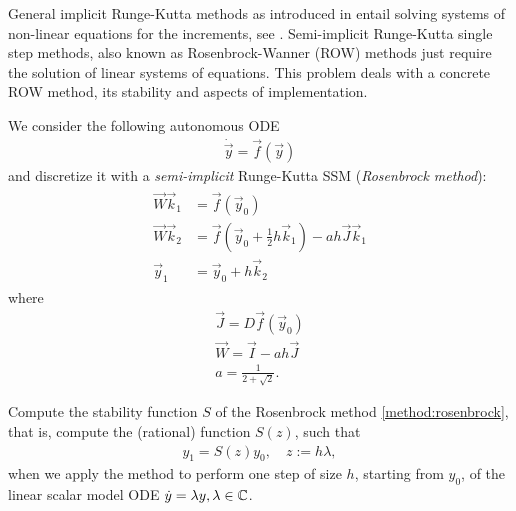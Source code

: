 \begin{problem}\label{prb:sirk-ssm}
  General implicit Runge-Kutta methods as introduced in  entail
  solving systems of non-linear equations for the increments, see
  . Semi-implicit Runge-Kutta single step methods, also
  known as Rosenbrock-Wanner (ROW) methods  just require the solution
  of linear systems of equations. This problem deals with a concrete ROW method,
  its stability and aspects of implementation.

  We consider the following  autonomous ODE
\begin{align}
 \dot{\vec{y}} = \vec{f}(\vec{y})
\end{align}
and discretize it with a \emph{semi-implicit} Runge-Kutta SSM (\emph{Rosenbrock method}):
\begin{gather} \label{method:rosenbrock}
  \begin{aligned}
    \vec{W} \vec{k}_1 & = \vec{f}(\vec{y}_0) \\
    \vec{W} \vec{k}_2 & = \vec{f}(\vec{y}_0 + \frac{1}{2} h \vec{k}_1) - a h \vec{J} \vec{k}_1 \\
    \vec{y}_1 & = \vec{y}_0 + h \vec{k}_2
  \end{aligned}
\end{gather}
where
\begin{align*}
 \vec{J} = D\vec{f}(\vec{y}_0) \\
 \vec{W} = \vec{I} - ah \vec{J} \\
 a = \frac{1}{2+\sqrt{2}}.
\end{align*}


\begin{subproblem}[2]
 Compute the stability function $S$ of the Rosenbrock method \eqref{method:rosenbrock}, that is, compute the (rational) function $S(z)$, such that
 \begin{align*}
  y_1 = S(z) y_0, \quad z := h \lambda,
 \end{align*}
 when we apply the method to perform one step of size $h$, starting from $y_0$, of the linear scalar model ODE $\dot{y} = \lambda y, \lambda \in \mathbb{C}$.


\end{subproblem}
\end{problem}
